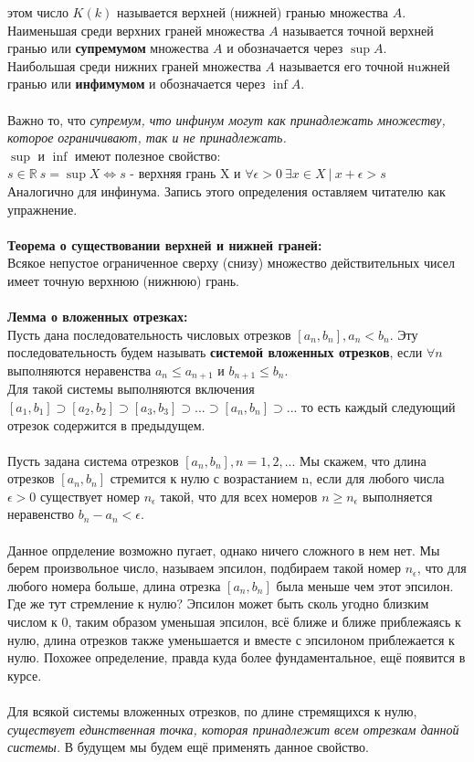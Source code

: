 \documentclass[a4paper]{article}
\begin{document}
этом число $K (k)$ называется верхней (нижней) гранью множества $A$.\\ Наименьшая
среди верхних граней множества $A$ называется точной верхней гранью или \textbf{супремумом} множества $A$ и обозначается через $\sup A$.\\Наибольшая среди нижних граней множества $A$ называется его точной нuжней гранью или \textbf{инфимумом} и обозначается через $\inf A$. \\\\Важно то, что \textit{супремум, что инфинум могут как принадлежать множеству, которое ограничивают, так и не принадлежать.}\\
$\sup$ и $\inf$ имеют полезное свойство:\\
$s \in \mathbb{R} \ s = \sup X \Leftrightarrow s$ - верхняя грань X и $\forall\epsilon > 0 \  \exists x \in X \  | \  x + \epsilon > s$\\
Аналогично для инфинума. Запись этого определения оставляем читателю как упражнение.
\\\\
\textbf{Теорема о существовании верхней и нижней граней:}\\
Всякое непустое ограниченное сверху (снизу) множество действительных чисел имеет точную верхнюю
(нижнюю) грань.
\\\\
\textbf{Лемма о вложенных отрезках:}\\
Пусть дана последовательность числовых отрезков ${[a_n, b_n]},
a_n < b_n$. Эту последовательность будем называть \textbf{системой вложенных отрезков}, если
$\forall n$ выполняются неравенства $a_n \leqslant a_{n+1}$ и $b_{n+1} \leqslant b_n$.\\
Для такой системы выполняются включения
$[a_1, b_1] \supset [a_2, b_2] \supset [a_3, b_3] \supset ... \supset [a_n, b_n] \supset ... $
то есть каждый следующий отрезок содержится в предыдущем. \\\\
Пусть задана система отрезков ${[a_n, b_n]}, n = 1, 2, ...$ Мы скажем, что длина отрезков $[a_n, b_n]$ стремится к нулю с возрастанием n, если для любого
числа $\epsilon > 0$ существует номер $n_\epsilon$ такой, что для всех номеров $n \geqslant n_\epsilon$ выполняется
неравенство $b_n - a_n < \epsilon$.\\\\Данное опрделение возможно пугает, однако ничего сложного в нем нет. Мы берем произвольное число, называем эпсилон, подбираем такой номер $n_\epsilon$, что для любого номера больше, длина отрезка $[a_n,b_n]$ была меньше чем этот эпсилон. Где же тут стремление к нулю? Эпсилон может быть сколь угодно близким числом к 0, таким образом уменьшая эпсилон, всё ближе и ближе приблежаясь к нулю, длина отрезков также уменьшается и вместе с эпсилоном приблежается к нулю. Похожее определение, правда куда более фундаментальное, ещё появится в курсе.\\\\
Для всякой системы вложенных отрезков, по длине стремящихся к
нулю, \textit{существует единственная точка, которая принадлежит всем отрезкам данной
системы.} В будущем мы будем ещё применять данное свойство. 
\end{document}
